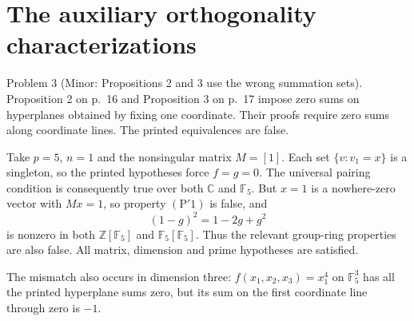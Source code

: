 \documentclass[10pt]{article}
\begin{document}
\section*{The auxiliary orthogonality characterizations}
Problem 3 (Minor: Propositions 2 and 3 use the wrong summation sets).  Proposition 2 on p. 16 and Proposition 3 on p. 17 impose zero sums on hyperplanes obtained by fixing one coordinate. Their proofs require zero sums along coordinate lines. The printed equivalences are false.\par
Take \(p=5\), \(n=1\) and the nonsingular matrix \(M=[1]\). Each set \(\{v:v_1=x\}\) is a singleton, so the printed hypotheses force \(f=g=0\). The universal pairing condition is consequently true over both \(\mathbb C\) and \(\mathbb F_5\). But \(x=1\) is a nowhere-zero vector with \(Mx=1\), so property \((\mathrm{P}'1)\) is false, and \[(1-g)^2=1-2g+g^2\] is nonzero in both \(\mathbb Z[\mathbb F_5]\) and \(\mathbb F_5[\mathbb F_5]\). Thus the relevant group-ring properties are also false. All matrix, dimension and prime hypotheses are satisfied.\par
The mismatch also occurs in dimension three: \(f(x_1,x_2,x_3)=x_1^4\) on \(\mathbb F_5^3\) has all the printed hyperplane sums zero, but its sum on the first coordinate line through zero is \(-1\).\par
\end{document}
